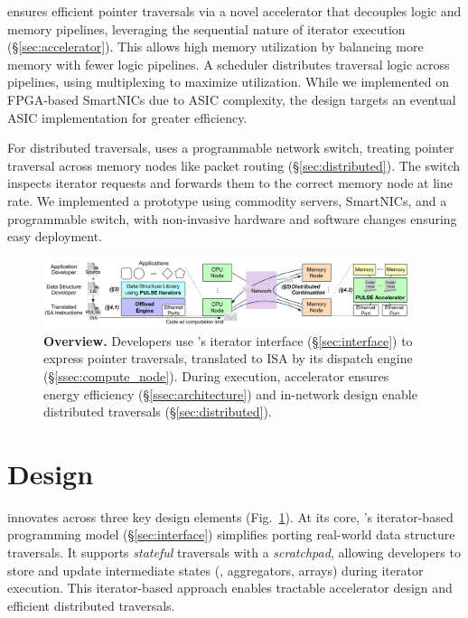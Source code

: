 \pulse ensures efficient pointer traversals via a novel accelerator that decouples logic and memory pipelines, leveraging the sequential nature of iterator execution (\S\ref{sec:accelerator}). This allows high memory utilization by balancing more memory with fewer logic pipelines. A scheduler distributes traversal logic across pipelines, using multiplexing to maximize utilization. While we implemented \pulse on FPGA-based SmartNICs due to ASIC complexity, the design targets an eventual ASIC implementation for greater efficiency.

For distributed traversals, \pulse uses a programmable network switch, treating pointer traversal across memory nodes like packet routing (\S\ref{sec:distributed}). The switch inspects iterator requests and forwards them to the correct memory node at line rate. We implemented a prototype using commodity servers, SmartNICs, and a programmable switch, with non-invasive hardware and software changes ensuring easy deployment.






\begin{figure}[ht!]
  \centering
  \includegraphics[width=0.95\textwidth]{fig/pulse/overview.pdf}
  \caption[\pulse Overview]{\textbf{\pulse Overview.} Developers use \pulse's iterator interface (\S\ref{sec:interface}) to express pointer traversals, translated to \pulse ISA by its dispatch engine (\S\ref{ssec:compute_node}). During execution, \pulse accelerator ensures energy efficiency (\S\ref{ssec:architecture}) and in-network design enable distributed traversals (\S\ref{sec:distributed}).} 
  \label{fig:general}
\end{figure}


\section{\pulse Design}
\label{sec:pulsedesign}

\pulse innovates across three key design elements (Fig.~\ref{fig:general}). At its core, \pulse's iterator-based programming model (\S\ref{sec:interface}) simplifies porting real-world data structure traversals. It supports \emph{stateful} traversals with a \emph{scratchpad}, allowing developers to store and update intermediate states (\eg, aggregators, arrays) during iterator execution. This iterator-based approach enables tractable accelerator design and efficient distributed traversals.

